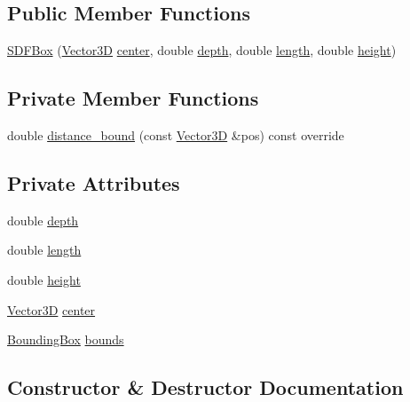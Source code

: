\subsection*{Public Member Functions}
\begin{DoxyCompactItemize}
\item 
\hyperlink{classSDFBox_a6b77f5c17997acf4155c29f55636a575}{S\+D\+F\+Box} (\hyperlink{classVector3D}{Vector3D} \hyperlink{classSDFBox_ab3c5b09a3c42843c995e28c3ee766c01}{center}, double \hyperlink{classSDFBox_a2e6708728c6bcadde76fdec645759ec7}{depth}, double \hyperlink{classSDFBox_a4e1fe9cab3361dcb2e57e5c639d1d56d}{length}, double \hyperlink{classSDFBox_a4be5004a92e2e6af1391287d46539a90}{height})
\end{DoxyCompactItemize}
\subsection*{Private Member Functions}
\begin{DoxyCompactItemize}
\item 
double \hyperlink{classSDFBox_aaeab9858412c2f3ad7e19ec9738e8aca}{distance\+\_\+bound} (const \hyperlink{classVector3D}{Vector3D} \&pos) const override
\end{DoxyCompactItemize}
\subsection*{Private Attributes}
\begin{DoxyCompactItemize}
\item 
double \hyperlink{classSDFBox_a2e6708728c6bcadde76fdec645759ec7}{depth}
\item 
double \hyperlink{classSDFBox_a4e1fe9cab3361dcb2e57e5c639d1d56d}{length}
\item 
double \hyperlink{classSDFBox_a4be5004a92e2e6af1391287d46539a90}{height}
\item 
\hyperlink{classVector3D}{Vector3D} \hyperlink{classSDFBox_ab3c5b09a3c42843c995e28c3ee766c01}{center}
\item 
\hyperlink{classBoundingBox}{Bounding\+Box} \hyperlink{classSDFBox_a3cb36bcbfc2b009bec6d2880ac3e93f0}{bounds}
\end{DoxyCompactItemize}


\subsection{Constructor \& Destructor Documentation}

